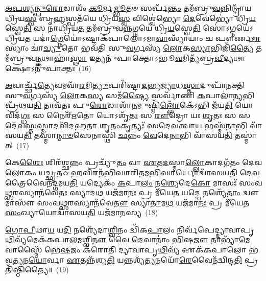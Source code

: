 \-\ul{𑌅}\-\-\ul{𑌪}\-\-\ul{𑌶𑍍𑌯}\-\-\ul{𑌨𑍍𑌪𑍁}\-\-\ul{𑌰𑍋}\-𑌡𑌾𑌶𑌂᳴ \ul{𑌕𑍂}\-𑌰𑍍𑌮\-\ul{𑌮𑍍𑌭𑍂}\-𑌤𑍞 𑌸𑌰𑍍𑌪᳴\-\ul{𑌨𑍍𑌤𑌂} 𑌤𑌮᳴𑌬𑍍𑌰𑍁\-\ul{𑌵}\-𑌨𑍍𑌨𑌿𑌨𑍍𑌦𑍍𑌰𑌾᳴𑌯 𑌧𑍍𑌰𑌿𑌯\-\ul{𑌸𑍍𑌵} 𑌬𑍃\-\ul{𑌹}\-𑌸𑍍𑌪𑌤᳴𑌯𑍇 𑌧𑍍𑌰𑌿𑌯\-\ul{𑌸𑍍𑌵} 𑌵𑌿𑌶𑍍𑌵𑍇॑𑌭𑍍𑌯𑍋 \ul{𑌦𑍇}\-𑌵𑍇𑌭𑍍𑌯𑍋॑ 𑌧𑍍𑌰𑌿\-\ul{𑌯}\-𑌸𑍍𑌵𑍇\-\ul{𑌤𑌿} 𑌸 𑌨𑌾𑌧𑍍𑌰𑌿᳴𑌯\-\ul{𑌤} 𑌤𑌮᳴𑌬𑍍𑌰𑍁𑌵\-\ul{𑌨𑍍𑌨}\-𑌗𑍍𑌨𑌯𑍇॑ 𑌧𑍍𑌰𑌿\-\ul{𑌯}\-𑌸𑍍𑌵𑍇\-\ul{𑌤𑌿} 𑌸𑍋॑\-𑌽𑌗𑍍𑌨𑌯𑍇॑\-𑌽𑌧𑍍𑌰𑌿𑌯\-\ul{𑌤} 𑌯𑌦𑌾॑\-\ul{𑌗𑍍𑌨𑍇}\-𑌯𑍋॑\-𑌽𑌷𑍍𑌟𑌾𑌕᳴𑌪𑌾𑌲𑍋\-𑌽𑌮𑌾\-\ul{𑌵𑌾}\-𑌸𑍍𑌯𑌾᳴𑌯𑌾𑌂 𑌚 𑌪𑍗𑌰𑍍𑌣\-\ul{𑌮𑌾}\-𑌸𑍍𑌯𑌾𑌂 𑌚𑌾॑\-\ul{𑌚𑍍𑌯𑍁}\-𑌤𑍋 𑌭𑌵᳴𑌤𑌿 𑌸𑍁\-\ul{𑌵}\-𑌰𑍍𑌗𑌸𑍍𑌯᳴ \ul{𑌲𑍋}\-𑌕\-\ul{𑌸𑍍𑌯𑌾}\-𑌭𑌿𑌜𑌿᳴\-\ul{𑌤𑍍𑌯𑍈} 𑌤𑌮᳴𑌬𑍍𑌰𑍁𑌵\-\ul{𑌨𑍍𑌕}\-𑌥𑌾𑌹𑌾॑\-\ul{𑌸𑍍𑌥𑌾} 𑌇𑌤𑍍𑌯𑌨𑍁᳴𑌪𑌾𑌕𑍍𑌤𑍋\-𑌽𑌭𑍂\-\ul{𑌵}\-𑌮𑌿𑌤𑍍𑌯᳴𑌬𑍍𑌰\-\ul{𑌵𑍀}\-𑌦𑍍𑌯𑌥𑌾𑌕𑍍𑌷𑍋\-𑌽𑌨𑍁᳴𑌪𑌾𑌕𑍍𑌤𑌃~(16)

\-\ul{𑌅}\-𑌵𑌾𑌰𑍍𑌚𑍍𑌛᳴\-\ul{𑌤𑍍𑌯𑍇}\-𑌵𑌮𑌵𑌾᳴\-\ul{𑌰}\-𑌮𑌿\-\ul{𑌤𑍍𑌯𑍁}\-𑌪𑌰𑌿᳴𑌷𑍍𑌟𑌾\-\ul{𑌦}\-𑌭𑍍𑌯\-\ul{𑌜𑍍𑌯𑌾}\-𑌧\-\ul{𑌸𑍍𑌤𑌾}\-𑌦𑍁𑌪𑌾᳴𑌨𑌕𑍍𑌤𑌿 𑌸𑍁\-\ul{𑌵}\-𑌰𑍍𑌗𑌸𑍍𑌯᳴ \ul{𑌲𑍋}\-𑌕\-\ul{𑌸𑍍𑌯} 𑌸𑌮᳴\-\ul{𑌷𑍍𑌟𑍍𑌯𑍈} 𑌸𑌰𑍍𑌵𑌾᳴𑌣𑌿 \ul{𑌕}\-𑌪𑌾𑌲𑌾॑\-\ul{𑌨𑍍𑌯}\-𑌭𑌿 𑌪𑍍𑌰᳴𑌥𑌯\-\ul{𑌤𑌿} 𑌤𑌾𑌵᳴𑌤𑌃 𑌪𑍁\-\ul{𑌰𑍋}\-𑌡𑌾𑌶𑌾᳴\-\ul{𑌨}\-𑌮𑍁𑌷𑍍𑌮𑌿᳴\-\ul{𑌲𑍍𑌲𑍋𑌁}\-𑌕𑍇᳴\-𑌽𑌭𑌿 𑌜᳴𑌯\-\ul{𑌤𑌿} 𑌯𑍋 𑌵𑌿𑌦᳴\-\ul{𑌗𑍍𑌧𑌃} 𑌸 𑌨𑍈𑌰𑍍\mbox{}᳴\-\ul{𑌋}\-𑌤𑍋 𑌯𑍋\-𑌽𑌶𑍃᳴\-\ul{𑌤𑌃} 𑌸 \ul{𑌰𑍗}\-𑌦𑍍𑌰𑍋 𑌯𑌃 \ul{𑌶𑍃}\-𑌤𑌃 𑌸 𑌸𑌦𑍇᳴\-\ul{𑌵}\-𑌸𑍍𑌤\-\ul{𑌸𑍍𑌮𑌾}\-𑌦𑌵𑌿᳴𑌦𑌹𑌤𑌾 𑌶𑍃\-\ul{𑌤𑌂}\-𑌕𑍃𑌤𑍍𑌯𑌃᳴ 𑌸𑌦𑍇\-\ul{𑌵}\-𑌤𑍍𑌵𑌾\-\ul{𑌯} 𑌭𑌸𑍍𑌮᳴\-\ul{𑌨𑌾}\-𑌭𑌿 𑌵𑌾᳴𑌸𑌯\-\ul{𑌤𑌿} 𑌤𑌸𑍍𑌮𑌾॑\-\ul{𑌨𑍍𑌮𑌾}\-\-\ul{𑍞}\-𑌸𑍇𑌨𑌾𑌸𑍍𑌥𑌿᳴ \ul{𑌛}\-𑌨𑍍𑌨𑌂 \ul{𑌵𑍇}\-𑌦𑍇\-\ul{𑌨𑌾}\-𑌭𑌿 𑌵𑌾᳴𑌸𑌯\-\ul{𑌤𑌿} 𑌤𑌸𑍍𑌮𑌾॑𑌤𑍍~(17)

𑌕𑍇\-\ul{𑌶𑍈𑌃} 𑌶𑌿𑌰᳴\-\ul{𑌶𑍍𑌛}\-𑌨𑍍𑌨𑌂 𑌪𑍍𑌰𑌚𑍍𑌯𑍁᳴\-\ul{𑌤𑌂} 𑌵𑌾 \ul{𑌏}\-𑌤\-\ul{𑌦}\-𑌸𑍍𑌮𑌾\-\ul{𑌲𑍍𑌲𑍋}\-𑌕𑌾𑌦𑌗᳴𑌤𑌂 𑌦𑍇𑌵\-\ul{𑌲𑍋}\-𑌕𑌂 𑌯\-\ul{𑌚𑍍𑌛𑍃}\-𑌤𑍞 \ul{𑌹}\-𑌵𑌿𑌰𑌨᳴𑌭𑌿𑌘𑌾𑌰𑌿𑌤𑌮\-\ul{𑌭𑌿}\-𑌘𑌾𑌰𑍍𑌯𑍋𑌦𑍍𑌵𑌾᳴𑌸𑌯𑌤𑌿 𑌦𑍇\-\ul{𑌵}\-𑌤𑍍𑌰𑍈𑌵𑍈𑌨᳴𑌦𑍍𑌗𑌮𑌯\-\ul{𑌤𑌿} 𑌯𑌦𑍍𑌯𑍇𑌕𑌂᳴ \ul{𑌕}\-𑌪𑌾\-\ul{𑌲𑌂} 𑌨\-\ul{𑌶𑍍𑌯𑍇}\-𑌦𑍇\-\ul{𑌕𑍋} 𑌮𑌾𑌸𑌃᳴ 𑌸𑌂𑌵\-\ul{𑌥𑍍𑌸}\-𑌰𑌸𑍍𑌯𑌾𑌨᳴𑌵𑍇\-\ul{𑌤𑌃} 𑌸𑍍𑌯𑌾𑌦\-\ul{𑌥} 𑌯𑌜᳴𑌮𑌾\-\ul{𑌨𑌃} 𑌪𑍍𑌰 𑌮𑍀᳴𑌯𑍇\-\ul{𑌤} 𑌯𑌦𑍍𑌦𑍍𑌵𑍇 𑌨𑌶𑍍𑌯𑍇᳴\-\ul{𑌤𑌾𑌂} 𑌦𑍍𑌵𑍗 𑌮𑌾𑌸𑍗᳴ 𑌸𑌂𑌵\-\ul{𑌥𑍍𑌸}\-𑌰𑌸𑍍𑌯𑌾𑌨᳴𑌵𑍇\-\ul{𑌤𑍗} 𑌸𑍍𑌯𑌾\-\ul{𑌤𑌾}\-𑌮\-\ul{𑌥} 𑌯𑌜᳴𑌮𑌾\-\ul{𑌨𑌃} 𑌪𑍍𑌰 𑌮𑍀᳴𑌯𑍇𑌤 \ul{𑌸𑌂}\-𑌖𑍍𑌯𑌾𑌯𑍋𑌦𑍍𑌵𑌾᳴𑌸𑌯\-\ul{𑌤𑌿} 𑌯𑌜᳴𑌮𑌾𑌨𑌸𑍍𑌯~(18)

\-\ul{𑌗𑍋}\-\-\ul{𑌪𑍀}\-𑌥𑌾\-\ul{𑌯} 𑌯\-\ul{𑌦𑌿} 𑌨𑌶𑍍𑌯𑍇᳴𑌦𑌾\-\ul{𑌶𑍍𑌵𑌿}\-𑌨𑌂 𑌦𑍍𑌵𑌿᳴𑌕\-\ul{𑌪𑌾}\-𑌲𑌂 𑌨𑌿𑌰𑍍𑌵᳴𑌪𑍇𑌦𑍍𑌦𑍍𑌯𑌾𑌵𑌾𑌪𑍃\-\ul{𑌥𑌿}\-𑌵𑍍𑌯᳴𑌮𑍇𑌕᳴𑌕𑌪𑌾𑌲\-\ul{𑌮}\-𑌶𑍍𑌵𑌿\-\ul{𑌨𑍗} 𑌵𑍈 \ul{𑌦𑍇}\-𑌵𑌾𑌨𑌾𑌂॑ \ul{𑌭𑌿}\-𑌷\-\ul{𑌜𑍗} 𑌤𑌾𑌭𑍍𑌯𑌾᳴\-\ul{𑌮𑍇}\-𑌵𑌾𑌸𑍍𑌮𑍈᳴ 𑌭𑍇\-\ul{𑌷}\-𑌜𑌂 𑌕᳴𑌰𑍋𑌤𑌿 𑌦𑍍𑌯𑌾𑌵𑌾𑌪𑍃\-\ul{𑌥𑌿}\-𑌵𑍍𑌯᳴ 𑌏𑌕᳴𑌕𑌪𑌾𑌲𑍋 𑌭𑌵\-\ul{𑌤𑍍𑌯}\-𑌨\-\ul{𑌯𑍋}\-𑌰𑍍𑌵𑌾 \ul{𑌏}\-𑌤𑌨𑍍𑌨᳴𑌶𑍍𑌯\-\ul{𑌤𑌿} 𑌯𑌨𑍍𑌨𑌶𑍍𑌯᳴\-\ul{𑌤𑍍𑌯}\-𑌨𑌯𑍋᳴\-\ul{𑌰𑍇}\-𑌵𑍈𑌨᳴𑌦𑍍𑌵𑌿𑌨𑍍𑌦\-\ul{𑌤𑌿} 𑌪𑍍𑌰𑌤𑌿᳴𑌷𑍍𑌠𑌿𑌤𑍍𑌯𑍈॥~(19)

{\anuvakamend[{\-\ul{𑌪𑍍𑌰𑌾}\-\-\ul{𑌜𑌾}\-\-\ul{𑌪}\-𑌤𑍍𑌯𑌨𑍍𑌤𑍇\-𑌽𑌕𑍍𑌷𑍋\-𑌽𑌨𑍁᳴𑌪𑌾𑌕𑍍𑌤𑍋 \ul{𑌵𑍇}\-𑌦𑍇\-\ul{𑌨𑌾}\-𑌭𑌿 𑌵𑌾᳴𑌸𑌯\-\ul{𑌤𑌿} 𑌤\-\ul{𑌸𑍍𑌮𑌾}\-𑌦𑍍𑌯𑌜᳴𑌮𑌾𑌨\-\ul{𑌸𑍍𑌯} 𑌦𑍍𑌵𑌾𑌤𑍍𑌰𑌿𑍞᳴𑌶𑌚𑍍𑌚}]}%

